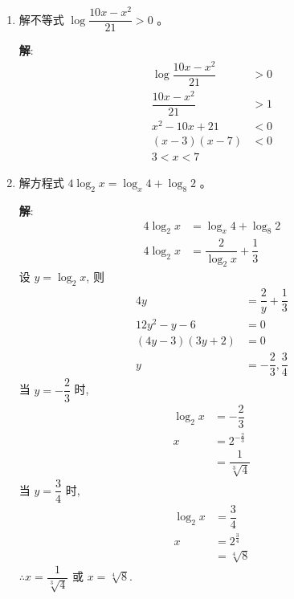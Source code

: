 \documentclass{report}
\newcommand{\sol}{\vspace{0.2cm}\textbf{解}:}
\begin{document}
\begin{multicols*}{2}
\begin{enumerate}[leftmargin=*]
        \item 解不等式 $\log \dfrac{10 x-x^2}{21}>0$ 。

              \sol{}
              \begin{align*}
                  \log \dfrac{10 x-x^2}{21} & > 0 \\
                  \dfrac{10 x-x^2}{21}      & > 1 \\
                  x^2 - 10x + 21            & < 0 \\
                  (x - 3)(x - 7)            & < 0 \\
                  3 < x < 7
              \end{align*}

        \item 解方程式 $4 \log _2 x=\log _x 4+\log _8 2$ 。

              \sol{}
              \begin{align*}
                  4 \log_2 x & = \log_x 4 + \log_8 2                \\
                  4 \log_2 x & = \dfrac{2}{\log_2 x} + \dfrac{1}{3}
              \end{align*}
              设 $y = \log_2 x$, 则
              \begin{align*}
                  4y               & = \dfrac{2}{y} + \dfrac{1}{3} \\
                  12y^2 - y - 6    & = 0                           \\
                  (4y - 3)(3y + 2) & = 0                           \\
                  y                & = -\dfrac{2}{3}, \dfrac{3}{4}
              \end{align*}
              当 $y = -\dfrac{2}{3}$ 时,
              \begin{align*}
                  \log_2 x & = -\dfrac{2}{3}          \\
                  x        & = 2^{-\frac{2}{3}}       \\
                           & = \dfrac{1}{\sqrt[3]{4}}
              \end{align*}
              当 $y = \dfrac{3}{4}$ 时,
              \begin{align*}
                  \log_2 x & = \dfrac{3}{4}    \\
                  x        & = 2^{\frac{3}{4}} \\
                           & = \sqrt[4]{8}
              \end{align*}
              $\therefore x = \dfrac{1}{\sqrt[3]{4}}$ 或 $x = \sqrt[4]{8}$.


\end{enumerate}
\end{multicols*}
\end{document}

